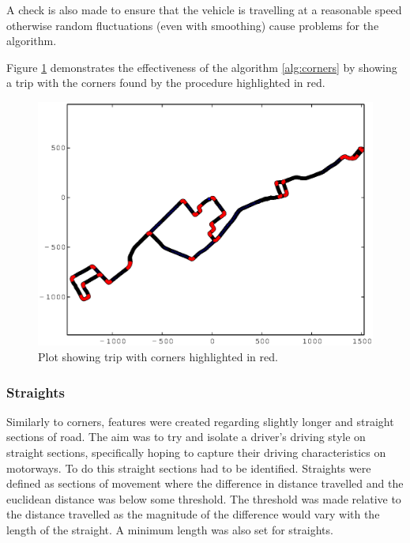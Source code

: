 \documentclass[a4paper, 11pt, twocolumn]{report}
\begin{document}
A check is also made to ensure that the vehicle is travelling at a reasonable speed otherwise random fluctuations (even with smoothing) cause problems for the algorithm.

Figure \ref{fig:corners} demonstrates the effectiveness of the algorithm \ref{alg:corners} by showing a trip with the corners found by the procedure highlighted in red. 

\begin{figure}[h]
    \center
    \includegraphics[width=\linewidth]{img/corners}
    \caption{Plot showing trip with corners highlighted in red.}
    \label{fig:corners}
\end{figure}

\subsubsection{Straights}

Similarly to corners, features were created regarding slightly longer and straight sections of road.
The aim was to try and isolate a driver's driving style on straight sections, specifically hoping to capture their driving characteristics on motorways.
To do this straight sections had to be identified.
Straights were defined as sections of movement where the difference in distance travelled and the euclidean distance was below some threshold.
The threshold was made relative to the distance travelled as the magnitude of the difference would vary with the length of the straight.
A minimum length was also set for straights.
\end{document}
